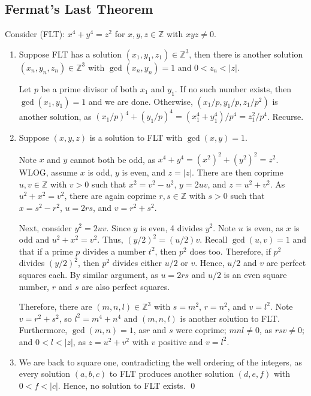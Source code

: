 \documentclass{article}
\newcommand{\Z}{\mathbb{Z}}
\begin{document}
\subsection{Fermat's Last Theorem}
  Consider (FLT): $x^4+y^4=z^2$ for $x,y,z\in\Z$ with $xyz\ne0$.
  \begin{enumerate}[label=\textbf{(\alph*)}]
    \item{
      Suppose FLT has a solution $(x_1,y_1,z_1)\in\Z^3$, then there is another
      solution $(x_n,y_n,z_n)\in\Z^3$ with $\gcd(x_n,y_n)=1$ and $0<z_n<|z|$.

      Let $p$ be a prime divisor of both $x_1$ and $y_1$. If no such number
      exists, then $\gcd(x_1,y_1)=1$ and we are done. Otherwise, $(x_1/p,y_1/p,
      z_1/p^2)$ is another solution, as $(x_1/p)^4+(y_1/p)^4=(x_1^4+y_1^4)/p^4=
      z_1^2/p^4$. Recurse.
    }
    \item{
      Suppose $(x,y,z)$ is a solution to FLT with $\gcd(x,y)=1$.

      Note $x$ and $y$ cannot both be odd, as $x^4+y^4=(x^2)^2+(y^2)^2=z^2$.
      WLOG, assume $x$ is odd, $y$ is even, and $z=|z|$. There are then coprime
      $u,v\in\Z$ with $v>0$ such that $x^2=v^2-u^2$, $y=2uv$, and $z=u^2+v^2$.
      As $u^2+x^2=v^2$, there are again coprime $r,s\in\Z$ with
      $s>0$ such that $x=s^2-r^2$, $u=2rs$, and $v=r^2+s^2$.

      Next, consider $y^2=2uv$. Since $y$ is even, 4 divides $y^2$. Note $u$
      is even, as $x$ is odd and $u^2+x^2=v^2$. Thus, $(y/2)^2=(u/2)v$. Recall
      $\gcd(u,v)=1$ and that if a prime $p$ divides a number $t^2$, then $p^2$
      does too. Therefore, if $p^2$ divides $(y/2)^2$, then $p^2$ divides either
      $u/2$ or $v$. Hence, $u/2$ and $v$ are perfect squares each. By similar
      argument, as $u=2rs$ and $u/2$ is an even square number, $r$ and $s$ are
      also perfect squares.

      Therefore, there are $(m,n,l)\in\Z^3$ with $s=m^2$, $r=n^2$, and $v=l^2$.
      Note $v=r^2+s^2$, so $l^2=m^4+n^4$ and $(m,n,l)$ is another solution to
      FLT. Furthermore, $\gcd(m,n)=1$, as$r$ and $s$ were coprime; $mnl\ne0$, as
      $rsv\ne0$; and $0<l<|z|$, as $z=u^2+v^2$ with $v$ positive and $v=l^2$.
    }
    \item{
      We are back to square one, contradicting the well ordering of the
      integers, as every solution $(a,b,c)$ to FLT produces another solution
      $(d,e,f)$ with $0<f<|c|$. Hence, no solution to FLT exists.
      \qed
    }
  \end{enumerate}
\end{document}

